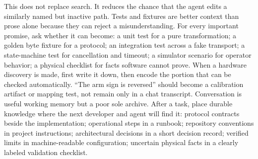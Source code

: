 {}This does not replace search. It reduces the chance that the agent edits a\markdownRendererSoftLineBreak
{}similarly named but inactive path.\markdownRendererInterblockSeparator
{}
\markdownRendererSectionEnd \markdownRendererSectionBegin
{}\markdownRendererInterblockSeparator
{}Tests and fixtures are better context than prose alone because they can reject\markdownRendererSoftLineBreak
{}a misunderstanding. For every important promise, ask whether it can become:\markdownRendererInterblockSeparator
{}\markdownRendererUlBegin
\markdownRendererUlItem a unit test for a pure transformation;\markdownRendererUlItemEnd 
\markdownRendererUlItem a golden byte fixture for a protocol;\markdownRendererUlItemEnd 
\markdownRendererUlItem an integration test across a fake transport;\markdownRendererUlItemEnd 
\markdownRendererUlItem a state-machine test for cancellation and timeout;\markdownRendererUlItemEnd 
\markdownRendererUlItem a simulator scenario for operator behavior;\markdownRendererUlItemEnd 
\markdownRendererUlItem a physical checklist for facts software cannot prove.\markdownRendererUlItemEnd 
\markdownRendererUlEnd \markdownRendererInterblockSeparator
{}When a hardware discovery is made, first write it down, then encode the portion\markdownRendererSoftLineBreak
{}that can be checked automatically. “The arm sign is reversed” should become a\markdownRendererSoftLineBreak
{}calibration artifact or mapping test, not remain only in a chat transcript.\markdownRendererInterblockSeparator
{}
\markdownRendererSectionEnd \markdownRendererSectionBegin
{}\markdownRendererInterblockSeparator
{}Conversation is useful working memory but a poor sole archive. After a task,\markdownRendererSoftLineBreak
{}place durable knowledge where the next developer and agent will find it:\markdownRendererInterblockSeparator
{}\markdownRendererUlBegin
\markdownRendererUlItem protocol contracts beside the implementation;\markdownRendererUlItemEnd 
\markdownRendererUlItem operational steps in a runbook;\markdownRendererUlItemEnd 
\markdownRendererUlItem repository conventions in project instructions;\markdownRendererUlItemEnd 
\markdownRendererUlItem architectural decisions in a short decision record;\markdownRendererUlItemEnd 
\markdownRendererUlItem verified limits in machine-readable configuration;\markdownRendererUlItemEnd 
\markdownRendererUlItem uncertain physical facts in a clearly labeled validation checklist.\markdownRendererUlItemEnd 
\markdownRendererUlEnd \markdownRendererInterblockSeparator
